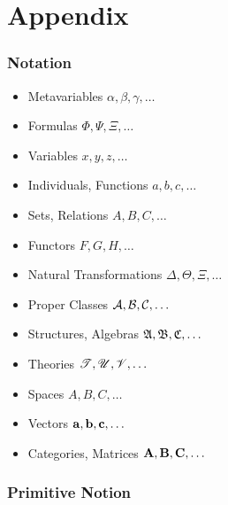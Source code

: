 \part{Appendix}\label{part:appendix}

\section{Notation}\label{sec:notation}

\begin{itemize}
  \item Metavariables $\alpha, \beta, \gamma, \ldots$
  \item Formulas $\Phi, \Psi, \Xi, \ldots$
  \item Variables $x, y, z, \ldots$
  \item Individuals, Functions $a, b, c, \ldots$
  \item Sets, Relations $A, B, C, \ldots$
  \item Functors $F, G, H, \ldots$
  \item Natural Transformations $\Delta, \Theta, \Xi, \ldots$
  \item Proper Classes $\mathcal{A}, \mathcal{B}, \mathcal{C}, \ldots$
  \item Structures, Algebras $\mathfrak{A}, \mathfrak{B},
    \mathfrak{C}, \ldots$
  \item Theories $\mathscr{T}, \mathscr{U}, \mathscr{V}, \ldots$
  \item Spaces $\xspace{A}, \xspace{B}, \xspace{C}, \ldots$
  \item Vectors $\mathbf{a}, \mathbf{b}, \mathbf{c}, \ldots$
  \item Categories, Matrices $\mathbf{A}, \mathbf{B}, \mathbf{C}, \ldots$
\end{itemize}



\section{Primitive Notion}\label{sec:primitive_notion}

